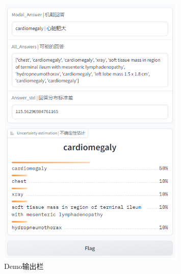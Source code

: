\begin{figure}[htbp]
\begin{minipage}{0.5\linewidth}
		\includegraphics[width=0.8\textwidth]{Fig/myfig/chapter5/demo_output2.png}  %
		\caption{\label{demo_output}Demo输出栏} 
	\end{minipage}
\end{figure}

